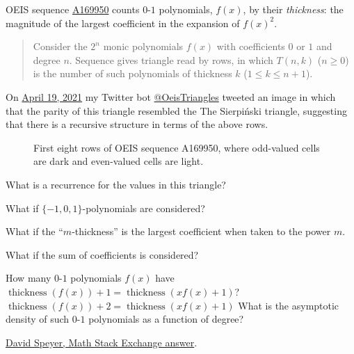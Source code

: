 \documentclass{article}
\begin{document}
OEIS sequence
\href{https://oeis.org/A169950}{A169950} counts $0$-$1$ polynomials, $f(x)$, by their
\textit{thickness}: the magnitude of the largest coefficient in the expansion of $f(x)^2$.
\begin{quote}
  Consider the $2^n$ monic polynomials $f(x)$ with coefficients $0$ or $1$ and degree $n$.
  Sequence gives triangle read by rows, in which $T(n,k)$ ($n \geq 0$) is the number of such polynomials of thickness $k$ ($1 \leq k \leq n+1$).
\end{quote}
On
\href{https://twitter.com/oeisTriangles/status/1384302498442215427}{April 19, 2021}
my Twitter bot
\href{https://twitter.com/oeisTriangles}{@OeisTriangles}
tweeted an image in which that the parity of this triangle resembled the
The Sierpi\'nski triangle, suggesting that there is a recursive structure in
terms of the above rows.

\begin{figure}[ht!]
  \centering
  \caption{
    First eight rows of OEIS sequence A169950, where odd-valued cells are dark
    and even-valued cells are light.
  }
\end{figure}

\begin{question}
  What is a recurrence for the values in this triangle?
\end{question}

\begin{related}
  \item What if $\{-1,0,1\}$-polynomials are considered?
  \item What if the ``$m$-thickness'' is the largest coefficient when taken to
    the power $m$.
  \item What if the sum of coefficients is considered?
  \item How many $0$-$1$ polynomials $f(x)$ have $\operatorname{thickness}(f(x)) + 1 = \operatorname{thickness}(xf(x)+1)$?
    $\operatorname{thickness}(f(x)) + 2 = \operatorname{thickness}(xf(x)+1)$
    What is the asymptotic density of such $0$-$1$ polynomials as a function
    of degree?
\end{related}

\begin{references}
  \item \href{https://math.stackexchange.com/a/4176545/121988}{David Speyer, Math Stack Exchange answer}.
\end{references}
\end{document}

